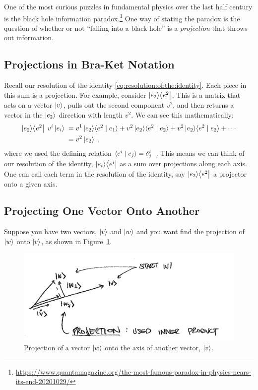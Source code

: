 \documentclass[12pt, oneside]{report}    %
\begin{document}
\begin{example}
One of the most curious puzzles in fundamental physics over the last half century is the black hole information paradox.\footnote{\url{https://www.quantamagazine.org/the-most-famous-paradox-in-physics-nears-its-end-20201029/}} One way of stating the paradox is the question of whether or not ``falling into a black hole'' is a \emph{projection} that throws out information. 
\end{example}

\subsection{Projections in Bra-Ket Notation}
Recall our resolution of the identity \eqref{eq:resolution:of:the:identity}. Each piece in this sum is a projection. For example, consider $\left|e_2\right\rangle\!\left\langle e^2\right|$. This is a matrix that acts on a vector $\left|v\right\rangle$, pulls out the second component $v^2$, and then returns a vector in the $\left|e_2\right\rangle$ direction with length $v^2$. We can see this mathematically:
\begin{align}
    \left|e_2\right\rangle\!\left\langle e^2\right| \; v^i\left|e_i\right\rangle \;
    &= 
    v^1\left|e_2\right\rangle\!\langle{e^2}\mid {e_1}\rangle + 
    v^2\left|e_2\right\rangle\!\langle{e^2}\mid {e_2}\rangle +
    v^2\left|e_2\right\rangle\!\langle{e^2}\mid {e_2}\rangle + \cdots
    \\ 
    &= v^2 \left|e_2\right\rangle \ ,
    \label{eq:projection:e2:e2}
\end{align}
where we used the defining relation $\langle e^i \mid e_j \rangle = \delta^i_j$\ . This means we can think of our resolution of the identity, $\left|e_i\right\rangle\!\left\langle e^i\right|$ as a sum over projections along each axis. One can call each term in the resolution of the identity, say $\left|e_2\right\rangle\!\left\langle e^2\right|$ a projector onto a given axis.

\subsection{Projecting One Vector Onto Another}

Suppose you have two vectors, $\left|v\right\rangle$ and $\left|w\right\rangle$ and you want find the projection of $\left|w\right\rangle$ onto $\left|v\right\rangle$, as shown in Figure~\ref{fig:gram:projection}. 
\begin{figure}[tb]
    \centering
    \includegraphics[width=.8\textwidth]{figures/gram-projection.jpg}
    \caption{Projection of a vector $\left|w\right\rangle$ onto the axis of another vector, $\left|v\right\rangle$.}
    \label{fig:gram:projection}
\end{figure}
\end{document}
